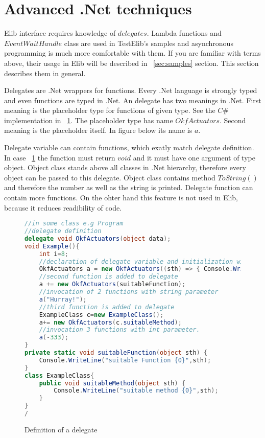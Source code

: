 \section{Advanced .Net techniques} \label{sec:net}
	Elib interface requires knowledge of $delegates$. Lambda functions and $EventWaitHandle$ class
	are used in TestElib's samples and asynchronous programming is much more comfortable with them.
	If you are familiar with terms above, their usage in Elib will be described in ~\ref{sec:samples} section.
	This section describes them in general.

	Delegates are .Net wrappers for functions. Every .Net language is strongly typed and even functions are typed in .Net.
	An delegate has two meanings in .Net. First meaning is the placeholder type for functions of given type. 
	See the $C\#$ implementation in ~\ref{deleg}. The placeholder type has name $OkfActuators$.
	Second meaning is the placeholder itself. In figure below its name is $a$.

	Delegate variable can contain functions, which exatly match delegate definition. In case ~\ref{deleg} the function must return
	$void$ and it must have one argument of type object. Object class stands above all classes in .Net hierarchy, therefore every object
	can be passed to this delegate. Object class contains method $ToString()$ and therefore the number as well as the string is printed.  
	Delegate function can contain more functions. On the ohter hand this feature is not used in Elib, because it reduces readibility of code.
	

\begin{figure}[!hbp]
\begin{lstlisting}[language=cs]
//in some class e.g Program
//delegate definition
delegate void OkfActuators(object data);
void Example(){
	int i=8;
	//declaration of delegate variable and initialization with lambda function
	OkfActuators a = new OkfActuators((sth) => { Console.WriteLine("Lambda f{0},{1}",sth,i); });
	//second function is added to delegate
	a += new OkfActuators(suitableFunction);
	//invocation of 2 functions with string parameter
	a("Hurray!");
	//third function is added to delegate
	ExampleClass c=new ExampleClass();
	a+= new OkfActuators(c.suitableMethod);
	//invocation 3 functions with int parameter.
	a(-333);
}
private static void suitableFunction(object sth) { 
	Console.WriteLine("suitable Function {0}",sth);
}
class ExampleClass{
	public void suitableMethod(object sth) { 	
		Console.WriteLine("suitable method {0}",sth);	
	}
}
/\end{lstlisting}
\caption{Definition of a delegate} \label{deleg}
\end{figure}

